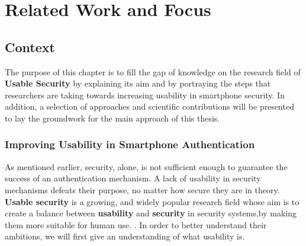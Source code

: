
\chapter{Related Work and Focus}\label{ch:second}

\section{Context}

The purpose of this chapter is to fill the gap of knowledge on the research field of \textbf{Usable Security} by explaining its aim and by portraying the steps that researchers are taking towards increasing usability in smartphone security. In addition, a selection of approaches and scientific contributions will be presented to lay the groundwork for the main approach of this thesis. 
 
\subsection{Improving Usability in Smartphone Authentication} \label{2.1.2}

As mentioned earlier, security, alone, is not sufficient enough to guarantee the success of an authentication mechanism. A lack of usability in security mechanisms defeats their purpose, no matter how secure they are in theory. \textbf{Usable security} is a growing, and widely popular research field whose aim is to create a balance between \textbf{usability} and \textbf{security} in security systems,by making them more suitable for human use. \cite{Realpe-Munoz, Zezschwitz}. In order to better understand their ambitions, we will first give an understanding of what usability is. \\

